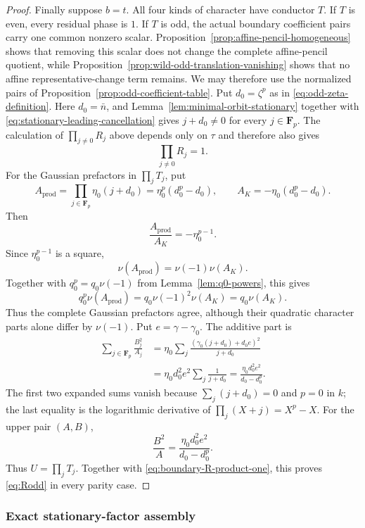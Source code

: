 \documentclass[11pt]{amsart}
\theoremstyle{definition}
\theoremstyle{remark}
\newcommand{\F}{\mathbf F}
\begin{document}
\begin{proof}
Finally suppose $b=t$.  All four kinds of character have conductor
$T$.  If $T$ is even, every residual phase is $1$.  If $T$ is odd, the
actual boundary coefficient pairs carry one common nonzero scalar.
Proposition~\ref{prop:affine-pencil-homogeneous} shows that removing
this scalar does not change the complete affine-pencil quotient, while
Proposition~\ref{prop:wild-odd-translation-vanishing} shows that no
affine representative-change term remains.  We may therefore use the
normalized pairs of Proposition~\ref{prop:odd-coefficient-table}.
Put $d_0=\zeta^p$ as in \eqref{eq:odd-zeta-definition}.  Here
$d_0=\bar n$, and Lemma~\ref{lem:minimal-orbit-stationary} together
with \eqref{eq:stationary-leading-cancellation} gives
$j+d_0\ne0$ for every $j\in\F_p$.
The calculation of $\prod_{j\ne0}R_j$ above depends only on
$\tau$ and therefore also gives
\begin{equation}\label{eq:boundary-R-product-one}
 \prod_{j\ne0}R_j=1.
\end{equation}
For the Gaussian prefactors in $\prod_jT_j$, put
\[
 A_{\mathrm{prod}}=
 \prod_{j\in\F_p}\eta_0(j+d_0)
 =\eta_0^p(d_0^p-d_0),
 \qquad
 A_K=-\eta_0(d_0^p-d_0).
\]
Then
\[
 \frac{A_{\mathrm{prod}}}{A_K}=-\eta_0^{p-1}.
\]
Since $\eta_0^{p-1}$ is a square,
\[
 \nu(A_{\mathrm{prod}})=\nu(-1)\nu(A_K).
\]
Together with $q_0^p=q_0\nu(-1)$ from
Lemma~\ref{lem:q0-powers}, this gives
\begin{equation}\label{eq:boundary-Gaussian-prefactors}
 q_0^p\nu(A_{\mathrm{prod}})
 =q_0\nu(-1)^2\nu(A_K)
 =q_0\nu(A_K).
\end{equation}
Thus the complete Gaussian prefactors agree, although their quadratic
character parts alone differ by $\nu(-1)$.  Put
$e=\gamma-\gamma_0$.  The additive part is
\begin{align*}
 \sum_{j\in\F_p}\frac{B_j^2}{A_j}
 &=\eta_0\sum_j
   \frac{(\gamma_0(j+d_0)+d_0e)^2}{j+d_0}\\
 &=\eta_0d_0^2e^2\sum_j\frac1{j+d_0}
 =\frac{\eta_0d_0^2e^2}{d_0-d_0^p}.
\end{align*}
The first two expanded sums vanish because
$\sum_j(j+d_0)=0$ and $p=0$ in $k$; the last equality is the logarithmic
derivative of $\prod_j(X+j)=X^p-X$.  For the upper pair $(A,B)$,
\[
 \frac{B^2}{A}=\frac{\eta_0d_0^2e^2}{d_0-d_0^p}.
\]
Thus $U=\prod_jT_j$.  Together with
\eqref{eq:boundary-R-product-one}, this proves \eqref{eq:Rodd} in every
parity case.
\end{proof}

\subsubsection{Exact stationary-factor assembly}
\end{document}
